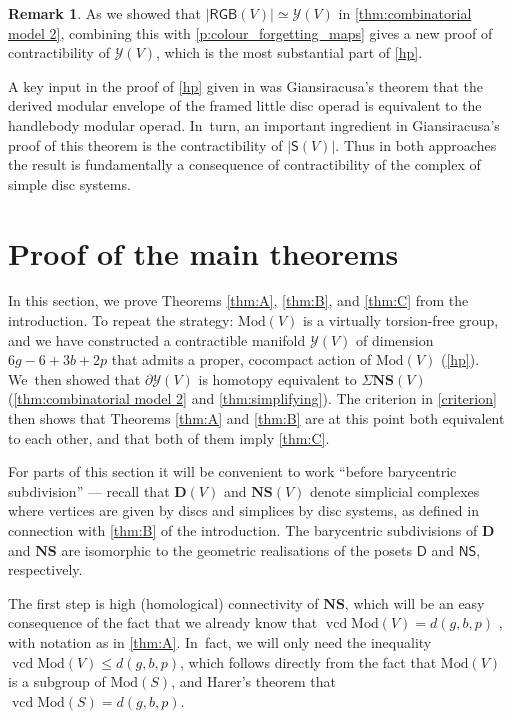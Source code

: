 \documentclass[JEP,XML,SOM,Unicode,NoFloatCountersInSection,published]{cedram}
\theoremstyle{plain}
\theoremstyle{definition}
\newtheorem{rem}[thm]{Remark}
\newcommand{\Y}{\mathcal Y}
\newcommand{\RGB}{{\mathsf{RGB}}}
\newcommand{\compNS}{\mathbf{NS}}
\newcommand{\compD}{\mathbf{D}}
\newcommand{\SD}{\mathsf{S}}
\newcommand{\mcg}{\mathrm{Mod}}
\newcommand{\hmod}{\mathrm{Mod}}
\begin{document}
\begin{rem} \label{rem:alternative_contractibility_proof} As we showed that $|\RGB(V)| \simeq \Y(V)$ in \cref{thm:combinatorial model 2}, combining this with \cref{p:colour_forgetting_maps} gives a new proof of contractibility of $\Y(V)$, which is the most substantial part of \cref{hp}.

A key input in the proof of \cref{hp} given in \cite{hainautpetersen} was Giansiracusa's theorem \cite{giansiracusa} that the derived modular envelope of the framed little disc operad is equivalent to the handlebody modular operad. In~turn, an important ingredient in Giansiracusa's proof of this theorem is the contractibility of $|\SD(V)|$. Thus in both approaches the result is fundamentally a consequence of contractibility of the complex of simple disc systems. \end{rem}

\section{Proof of the main theorems}

In this section, we prove Theorems \ref{thm:A}, \ref{thm:B}, and \ref{thm:C} from the introduction. To repeat the strategy: $\hmod(V)$ is a virtually torsion-free group, and we have constructed a contractible manifold $\mathcal{Y}(V)$ of dimension $6g-6+3b+2p$ that admits a proper, cocompact action of $\hmod(V)$ (\cref{hp}). We~then showed that $\partial \mathcal{Y}(V)$ is homotopy equivalent to $\Sigma \compNS(V)$ (\cref{thm:combinatorial model 2} and \cref{thm:simplifying}). The criterion in \cref{criterion} then shows that Theorems \ref{thm:A} and \ref{thm:B} are at this point both equivalent to each other, and that both of them imply \cref{thm:C}.

For parts of this section it will be convenient to work ``before barycentric subdivision'' --- recall that $\compD(V)$ and $\compNS(V)$ denote simplicial complexes where vertices are given by discs and simplices by disc systems, as defined in connection with \cref{thm:B} of the introduction. The barycentric subdivisions of $\compD$ and $\compNS$ are isomorphic to the geometric realisations of the posets $\mathsf D$ and $\mathsf{NS}$, respectively.

The first step is high (homological) connectivity of $\compNS$, which will be an easy consequence of the fact that we already know that $\operatorname{vcd}\hmod(V) =d(g,b,p)$ \cite{hirose}, with notation as in \cref{thm:A}. In~fact, we will only need the inequality $\operatorname{vcd} \hmod(V)\leq d(g,b,p)$, which follows directly from the fact that $\hmod(V)$ is a subgroup of $\mcg(S)$, and Harer's theorem \cite{harer} that $\operatorname{vcd} \mcg(S)=d(g,b,p).$
\end{document}

